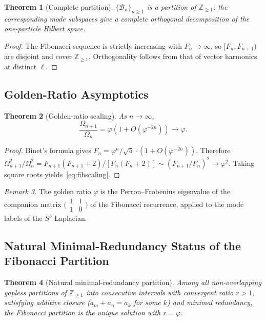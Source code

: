\documentclass[
  aps,
  prd,
  reprint,
  superscriptaddress,
  nofootinbib,
  longbibliography,
  amsmath,
  amssymb
]{revtex4-2}
\theoremstyle{plain}
\newtheorem{theorem}{Theorem}[section]
\theoremstyle{definition}
\theoremstyle{remark}
\newtheorem{remark}[theorem]{Remark}
\newcommand{\vp}{\varphi}
\begin{document}
\begin{theorem}[Complete partition]
  \label{thm:partition}
  $\{\mathcal{B}_n\}_{n\geq1}$ is a partition of $\mathbb{Z}_{\geq1}$;
  the corresponding mode subspaces give a complete orthogonal
  decomposition of the one-particle Hilbert space.
\end{theorem}

\begin{proof}
  The Fibonacci sequence is strictly increasing with $F_n\to\infty$,
  so $[F_n,F_{n+1})$ are disjoint and cover $\mathbb{Z}_{\geq1}$.
  Orthogonality follows from that of vector harmonics at distinct $\ell$.
\end{proof}

\subsection{Golden-Ratio Asymptotics}

\begin{theorem}[Golden-ratio scaling]
  \label{thm:fibscaling}
  As $n\to\infty$,
  \begin{equation}
    \frac{\Omega_{n+1}}{\Omega_n} = \vp\!\left(1+O(\vp^{-2n})\right)\to\vp.
    \label{eq:fibscaling}
  \end{equation}
\end{theorem}

\begin{proof}
  Binet's formula gives $F_n=\vp^n/\sqrt5\cdot(1+O(\vp^{-2n}))$.
  Therefore
  $\Omega_{n+1}^2/\Omega_n^2 = F_{n+1}(F_{n+1}+2)/[F_n(F_n+2)]
  \sim(F_{n+1}/F_n)^2\to\vp^2$.
  Taking square roots yields~\eqref{eq:fibscaling}.
\end{proof}

\begin{remark}
  The golden ratio $\vp$ is the Perron--Frobenius eigenvalue of the
  companion matrix $\bigl(\begin{smallmatrix}1&1\\1&0\end{smallmatrix}\bigr)$
  of the Fibonacci recurrence, applied to the mode labels of the
  $S^3$ Laplacian.
\end{remark}

\subsection{Natural Minimal-Redundancy Status of the Fibonacci Partition}

\begin{theorem}[Natural minimal-redundancy partition]
  \label{thm:unique}
  Among all non-overlapping gapless partitions of $\mathbb{Z}_{\geq1}$
  into consecutive intervals with convergent ratio $r>1$, satisfying
  additive closure ($a_m+a_n=a_k$ for some $k$) and minimal redundancy,
  the Fibonacci partition is the unique solution with $r=\vp$.
\end{theorem}
\end{document}
